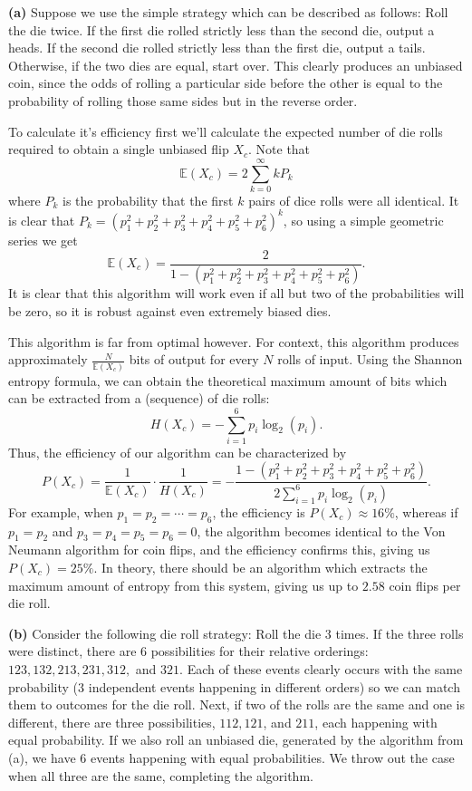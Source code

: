 \documentclass[11pt, letterpaper]{article}
\begin{document}
\begin{solution}
    \textbf{(a)} Suppose we use the simple strategy which can be described as follows: Roll the die twice. If the first die rolled strictly less than the second die, output a heads. If the second die rolled strictly less than the first die, output a tails. Otherwise, if the two dies are equal, start over. This clearly produces an unbiased coin, since the odds of rolling a particular side before the other is equal to the probability of rolling those same sides but in the reverse order. 

    To calculate it's efficiency first we'll calculate the expected number of die rolls required to obtain a single unbiased flip $X_c$. Note that
    \[
       \mathbb{E}(X_c) = 2\sum_{k=0}^\infty k P_k
    \]
    where $P_k$ is the probability that the first $k$ pairs of dice rolls were all identical. It is clear that $P_k=(p_1^2+p_2^2+p_3^2+p_4^2+p_5^2+p_6^2)^k$, so using a simple geometric series we get
    \[
       \mathbb{E}(X_c) = \frac{2}{1-(p_1^2+p_2^2+p_3^2+p_4^2+p_5^2+p_6^2)} 
    .\]     
    It is clear that this algorithm will work even if all but two of the probabilities will be zero, so it is robust against even extremely biased dies.
    
    This algorithm is far from optimal however. For context, this algorithm produces approximately $\frac{N}{\mathbb{E}(X_c)}$ bits of output for every $N$ rolls of input. Using the Shannon entropy formula, we can obtain the theoretical maximum amount of bits which can be extracted from a (sequence) of die rolls:
    \[
        H(X_c)=-\sum^{6}_{i=1}p_i\log_2(p_i)
    .\] 
    Thus, the efficiency of our algorithm can be characterized by
    \[
        P(X_c)=\frac{1}{\mathbb{E}(X_c)}\cdot \frac{1}{H(X_c)} = -\frac{1-(p_1^2+p_2^2+p_3^2+p_4^2+p_5^2+p_6^2)}{2\sum^{6}_{i=1}p_i\log_2(p_i)}
    .\] 
    For example, when $p_1=p_2=\cdots=p_6$, the efficiency is $P(X_c)\approx 16\%$, whereas if $p_1=p_2$ and $p_3=p_4=p_5=p_6=0$, the algorithm becomes identical to the Von Neumann algorithm for coin flips, and the efficiency confirms this, giving us $P(X_c)=25\%$. In theory, there should be an algorithm which extracts the maximum amount of entropy from this system, giving us up to $2.58$ coin flips per die roll.  

    \textbf{(b)} Consider the following die roll strategy: Roll the die 3 times. If the three rolls were distinct, there are $6$ possibilities for their relative orderings: $123, 132, 213, 231, 312,$ and $321$. Each of these events clearly occurs with the same probability ($3$ independent events happening in different orders) so we can match them to outcomes for the die roll. Next, if two of the rolls are the same and one is different, there are three possibilities, $112, 121$, and $211$, each happening with equal probability. If we also roll an unbiased die, generated by the algorithm from (a), we have 6 events happening with equal probabilities. We throw out the case when all three are the same, completing the algorithm. 


\end{solution}
\end{document}
